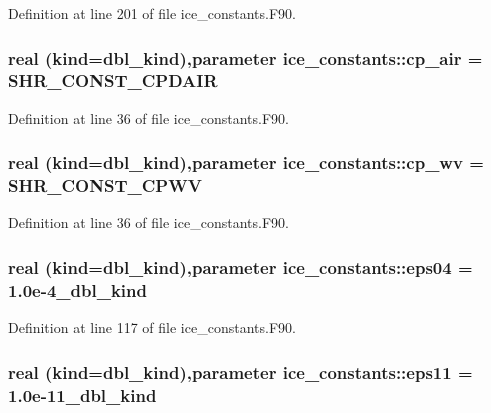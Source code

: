 Definition at line 201 of file ice\_\-constants.F90.\hypertarget{namespaceice__constants_a36c2903a1fdb4ce659dd1012f8abdfae}{
\subsubsection[{cp\_\-air}]{\setlength{\rightskip}{0pt plus 5cm}real (kind=dbl\_\-kind),parameter {\bf ice\_\-constants::cp\_\-air} = SHR\_\-CONST\_\-CPDAIR}}
\label{namespaceice__constants_a36c2903a1fdb4ce659dd1012f8abdfae}


Definition at line 36 of file ice\_\-constants.F90.\hypertarget{namespaceice__constants_ab75b8b01ca0c808ceaf81ceaea962456}{
\subsubsection[{cp\_\-wv}]{\setlength{\rightskip}{0pt plus 5cm}real (kind=dbl\_\-kind),parameter {\bf ice\_\-constants::cp\_\-wv} = SHR\_\-CONST\_\-CPWV}}
\label{namespaceice__constants_ab75b8b01ca0c808ceaf81ceaea962456}


Definition at line 36 of file ice\_\-constants.F90.\hypertarget{namespaceice__constants_a05332a868b891940e57c06ddeab5963a}{
\subsubsection[{eps04}]{\setlength{\rightskip}{0pt plus 5cm}real (kind=dbl\_\-kind),parameter {\bf ice\_\-constants::eps04} = 1.0e-\/4\_\-dbl\_\-kind}}
\label{namespaceice__constants_a05332a868b891940e57c06ddeab5963a}


Definition at line 117 of file ice\_\-constants.F90.\hypertarget{namespaceice__constants_a702360aa78f70d763c2c4d3d3215d980}{
\subsubsection[{eps11}]{\setlength{\rightskip}{0pt plus 5cm}real (kind=dbl\_\-kind),parameter {\bf ice\_\-constants::eps11} = 1.0e-\/11\_\-dbl\_\-kind}}
\label{namespaceice__constants_a702360aa78f70d763c2c4d3d3215d980}



